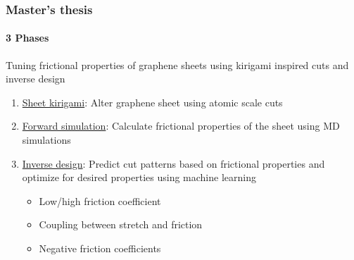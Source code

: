 \documentclass[
	10pt, %
]{beamer}
\begin{document}
\begin{frame}
	\frametitle{Master's thesis}
	\framesubtitle{3 Phases}

	{\large Tuning frictional properties of graphene sheets using kirigami inspired cuts and inverse design}
	\newline
	
	\begin{enumerate}
		\setlength\itemsep{2em}
		\item \underline{Sheet kirigami}: Alter graphene sheet using atomic scale cuts %
		\item \underline{Forward simulation}: Calculate frictional properties of the sheet using MD simulations
		\item \underline{Inverse design}: Predict cut patterns based on frictional properties and optimize for desired properties using machine learning
		\begin{itemize}
			\item Low/high friction coefficient
			\item Coupling between stretch and friction
			\item Negative friction coefficients
		\end{itemize} 
	\end{enumerate}
\end{frame}
\end{document}
